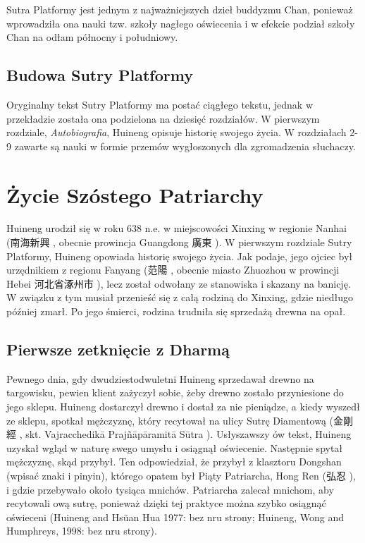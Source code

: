 Sutra Platformy jest jednym z najważniejszych dzieł buddyzmu Chan, ponieważ wprowadziła ona nauki tzw. szkoły nagłego oświecenia i w efekcie podział szkoły Chan na odłam północny i południowy. %

\subsection{Budowa Sutry Platformy}
Oryginalny tekst Sutry Platformy ma postać ciągłego tekstu, jednak w przekładzie została ona podzielona na dziesięć rozdziałów. W pierwszym rozdziale, \emph{Autobiografia}, Huineng opisuje historię swojego życia. W rozdziałach 2-9 zawarte są nauki w formie przemów wygłoszonych dla zgromadzenia słuchaczy. 

\section{Życie Szóstego Patriarchy}
Huineng urodził się w roku 638 n.e. w miejscowości Xinxing w regionie Nanhai (南海新興 , obecnie prowincja Guangdong 廣東 ). W pierwszym rozdziale Sutry Platformy, Huineng opowiada historię swojego życia. Jak podaje, jego ojciec był urzędnikiem z regionu Fanyang (范陽 , obecnie miasto Zhuozhou w prowincji Hebei 河北省涿州市 ), lecz został odwołany ze stanowiska i skazany na banicję. W związku z tym musiał przenieść się z całą rodziną do Xinxing, gdzie niedługo później zmarł. Po jego śmierci, rodzina trudniła się sprzedażą drewna na opał.

\subsection{Pierwsze zetknięcie z Dharmą}
Pewnego dnia, gdy dwudziestodwuletni Huineng sprzedawał drewno na targowisku, pewien klient zażyczył sobie, żeby drewno zostało przyniesione do jego sklepu. Huineng dostarczył drewno i dostał za nie pieniądze, a kiedy wyszedł ze sklepu, spotkał mężczyznę, który recytował na ulicy Sutrę Diamentową (金剛經 , skt. Vajracchedikā Prajñāpāramitā Sūtra %
). Usłyszawszy ów tekst, Huineng uzyskał wgląd w naturę swego umysłu i osiągnął oświecenie. Następnie spytał mężczyznę, skąd przybył. Ten odpowiedział, że przybył z klasztoru Dongshan (wpisać znaki i pinyin), którego opatem był Piąty Patriarcha, Hong Ren (弘忍 ), i gdzie przebywało około tysiąca mnichów. Patriarcha zalecał mnichom, aby recytowali ową sutrę, ponieważ dzięki tej praktyce można szybko osiągnąć oświeceni (Huineng and Hsüan Hua 1977: bez nru strony; Huineng, Wong and Humphreys, 1998: bez nru strony).


